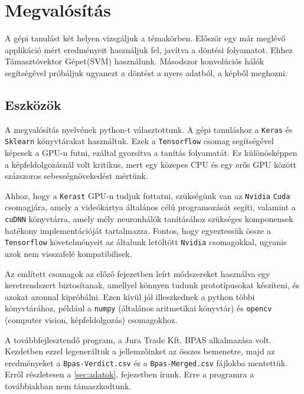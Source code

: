 \newpage
\section{Megvalósítás}

A gépi tanulást két helyen vizsgáljuk a témakörben.
Először egy már meglévő applikáció mért eredményeit használjuk fel,
javítva a döntési folyamatot. Ehhez Támasztóvektor Gépet(SVM) használunk.
Másodszor konvolúciós hálók segítségével próbáljuk ugyanezt a döntést 
a nyers adatból, a képből meghozni. 

\subsection{Eszközök}

A megvalósítás nyelvének python-t választottunk.
A gépi tanuláshoz a \texttt{Keras} \cite{keras} és \texttt{Sklearn} \cite{sklearn} könyvtárakat 
használtuk. Ezek a \texttt{Tensorflow} \cite{tensorflow} csomag segítségével képesek a
GPU-n futni, ezáltal gyorsítva a tanítás folyamatát. Ez különösképpen a 
képfeldolgozásnál volt kritikus, mert egy közepes CPU és egy erős GPU között
százszoros sebességnövekedést mértünk.

Ahhoz, hogy a \texttt{Kerast} GPU-n tudjuk futtatni, szükségünk van az \texttt{Nvidia}
\texttt{Cuda}\cite{cuda} csomagjára, amely a videókártya általános célú programozását 
segíti, valamint a \texttt{cuDNN}\cite{cudnn} könyvtárra, amely mély neuronhálók tanításához 
szükséges komponensek hatékony implementációját tartalmazza. Fontos, hogy egyeztessük
össze a \texttt{Tensorflow} követelményeit az általunk letöltött \texttt{Nvidia} csomagokkal,
ugyanis azok nem visszafelé kompatibilisek.

Az említett csomagok az előző fejezetben leírt módszereket használva egy
keretrendszert biztosítanak, amellyel könnyen tudunk prototípusokat készíteni,
és azokat azonnal kipróbálni. Ezen kívül jól illeszkednek a python többi könyvtárához,
például a \texttt{numpy}\cite{numpy} (általános aritmetikai könyvtár) és \texttt{opencv} \cite{opencv}
(computer vision, képfeldolgozás) csomagokhoz.


A továbbfejlesztendő program, a Jura Trade Kft. BPAS alkalmazása volt. Kezdetben ezzel legeneráltuk
a jellemzőinket az összes bemenetre, majd az eredményeket a \texttt{Bpas-Verdict.csv} és
a \texttt{Bpas-Merged.csv} fájlokba mentettük. Erről részletesen a \ref{sec:adatok}.
fejezetben írunk. Erre a programra a továbbiakban nem támaszkodtunk.



